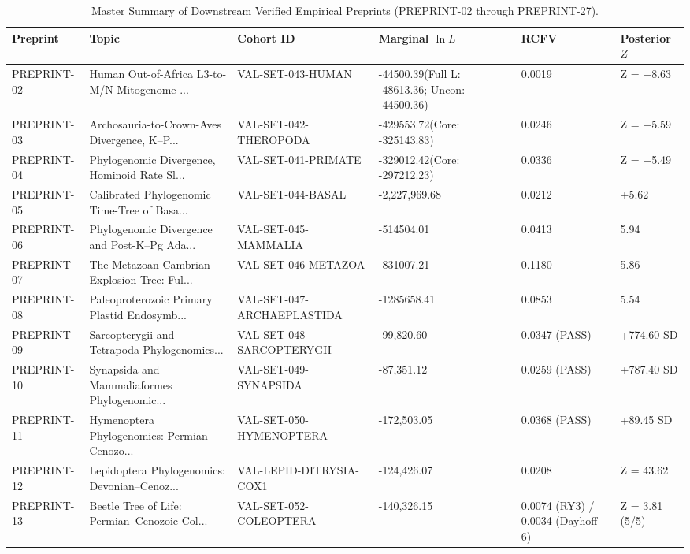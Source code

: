 \documentclass[11pt,twocolumn]{article}
\begin{document}
\begin{table}[t]
\centering
\caption{Master Summary of Downstream Verified Empirical Preprints (PREPRINT-02 through PREPRINT-27).}
\footnotesize
\begin{tabular}{llllll}
\toprule
Preprint & Topic & Cohort ID & Marginal $\ln L$ & RCFV & Posterior $Z$ \\
\midrule
PREPRINT-02 \cite{white2026_p02} & Human Out-of-Africa L3-to-M/N Mitogenome ... & VAL-SET-043-HUMAN & -44500.39(Full L: -48613.36; Uncon: -44500.36) & 0.0019 & Z = +8.63 \\
PREPRINT-03 \cite{white2026_p03} & Archosauria-to-Crown-Aves Divergence, K--P... & VAL-SET-042-THEROPODA & -429553.72(Core: -325143.83) & 0.0246 & Z = +5.59 \\
PREPRINT-04 \cite{white2026_p04} & Phylogenomic Divergence, Hominoid Rate Sl... & VAL-SET-041-PRIMATE & -329012.42(Core: -297212.23) & 0.0336 & Z = +5.49 \\
PREPRINT-05 \cite{white2026_p05} & Calibrated Phylogenomic Time-Tree of Basa... & VAL-SET-044-BASAL & -2,227,969.68 & 0.0212 & +5.62 \\
PREPRINT-06 \cite{white2026_p06} & Phylogenomic Divergence and Post-K--Pg Ada... & VAL-SET-045-MAMMALIA & -514504.01 & 0.0413 & 5.94 \\
PREPRINT-07 \cite{white2026_p07} & The Metazoan Cambrian Explosion Tree: Ful... & VAL-SET-046-METAZOA & -831007.21 & 0.1180 & 5.86 \\
PREPRINT-08 \cite{white2026_p08} & Paleoproterozoic Primary Plastid Endosymb... & VAL-SET-047-ARCHAEPLASTIDA & -1285658.41 & 0.0853 & 5.54 \\
PREPRINT-09 \cite{white2026_p09} & Sarcopterygii and Tetrapoda Phylogenomics... & VAL-SET-048-SARCOPTERYGII & -99,820.60 & 0.0347 (PASS) & +774.60 SD \\
PREPRINT-10 \cite{white2026_p10} & Synapsida and Mammaliaformes Phylogenomic... & VAL-SET-049-SYNAPSIDA & -87,351.12 & 0.0259 (PASS) & +787.40 SD \\
PREPRINT-11 \cite{white2026_p11} & Hymenoptera Phylogenomics: Permian--Cenozo... & VAL-SET-050-HYMENOPTERA & -172,503.05 & 0.0368 (PASS) & +89.45 SD \\
PREPRINT-12 \cite{white2026_p12} & Lepidoptera Phylogenomics: Devonian--Cenoz... & VAL-LEPID-DITRYSIA-COX1 & -124,426.07 & 0.0208 & Z = 43.62 \\
PREPRINT-13 \cite{white2026_p13} & Beetle Tree of Life: Permian--Cenozoic Col... & VAL-SET-052-COLEOPTERA & -140,326.15 & 0.0074 (RY3) / 0.0034 (Dayhoff-6) & Z = 3.81 (5/5) \\

\end{tabular}
\end{table}
\end{document}
